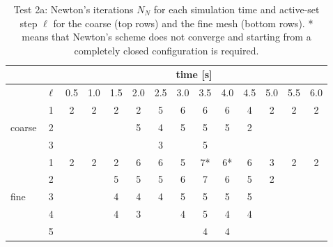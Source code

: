 \documentclass[3p,times]{elsarticle}
\theoremstyle{plain}
\begin{document}
\begin{table}%
  \centering
  \begin{tabular}{lc|c|c|c|c|c|c|c|c|c|c|c|c|}
    & & \multicolumn{12}{|c|}{time [s]} \\
    \hline
    & $\ell$ & 0.5 & 1.0 & 1.5 & 2.0 & 2.5 & 3.0 & 3.5 & 4.0 & 4.5 & 5.0 & 5.5 & 6.0 \\
    \hline
    & 1 & 2 &
      2 & 2 & 2 & 5 & 6 & 6 & 6 & 4 & 2 & 2 & 2 \\
    coarse & 2 &   &   &   & 5 & 4 & 5 & 5 & 5 & 2 &   &   &   \\
    & 3 &   &   &   &   & 3 &   & 5 &   &   &   &   &   \\
%
    \hline
    & 1 & 2 &
      2 & 2 & 6 & 6 & 5 & 7*& 6*& 6 & 3 & 2 & 2 \\
    & 2 &   &   & 5 & 5 & 5 & 6 & 7 & 6 & 5 & 2 &   &   \\
    fine & 3 &   &   & 4 & 4 & 4 & 5 & 5 & 5 & 5 &   &   &   \\
    & 4 &   &   & 4 & 3 &   & 4 & 5 & 4 & 4 &   &   &   \\
    & 5 &   &   &   &   &   &   & 4 & 4 &   &   &   &   \\
  \end{tabular}%
  \caption{Test 2a: Newton's iterations $N_N$ for each simulation time and active-set step $\ell$ for the coarse (top rows) and the fine mesh (bottom rows). * means that Newton's scheme
    does not converge and starting from a completely closed configuration is required.}
  \label{tab:t2_nnlin}
\end{table}

\end{document}
